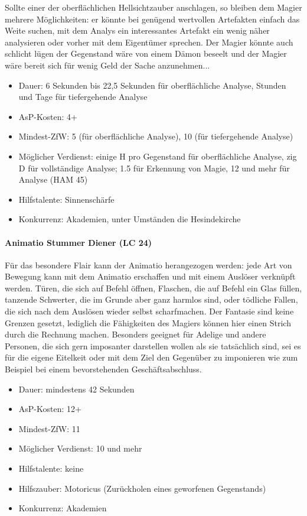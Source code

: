 Sollte einer der oberflächlichen Hellsichtzauber anschlagen, so bleiben dem Magier mehrere Möglichkeiten: er könnte bei genügend wertvollen Artefakten einfach das Weite suchen, mit dem Analys ein interessantes Artefakt ein wenig näher analysieren oder vorher mit dem Eigentümer sprechen. Der Magier könnte auch schlicht lügen der Gegenstand wäre von einem Dämon beseelt und der Magier wäre bereit sich für wenig Geld der Sache anzunehmen...
\begin{itemize}
	\item Dauer: 6 Sekunden bis 22,5 Sekunden für oberflächliche Analyse, Stunden und Tage für tiefergehende Analyse
	\item AsP-Kosten: 4+
	\item Mindest-ZfW: 5 (für oberflächliche Analyse), 10 (für tiefergehende Analyse)
	\item Möglicher Verdienst: einige H pro Gegenstand für oberflächliche Analyse, zig D für vollständige Analyse; \SI{1,5}{\D} für Erkennung von Magie, \SI{12}{\D} und mehr für Analyse (HAM 45)
	\item Hilfstalente: Sinnenschärfe
	\item Konkurrenz: Akademien, unter Umständen die Hesindekirche
\end{itemize}

\paragraph{Animatio Stummer Diener (LC 24)}
Für das besondere Flair kann der Animatio herangezogen werden: jede Art von Bewegung kann mit dem Animatio erschaffen und mit einem Auslöser verknüpft werden. Türen, die sich auf Befehl öffnen, Flaschen, die auf Befehl ein Glas füllen, tanzende Schwerter, die im Grunde aber ganz harmlos sind, oder tödliche Fallen, die sich nach dem Auslösen wieder selbst scharfmachen. Der Fantasie sind keine Grenzen gesetzt, lediglich die Fähigkeiten des Magiers können hier einen Strich durch die Rechnung machen. Besonders geeignet für Adelige und andere Personen, die sich gern imposanter darstellen wollen als sie tatsächlich sind, sei es für die eigene Eitelkeit oder mit dem Ziel den Gegenüber zu imponieren wie zum Beispiel bei einem bevorstehenden Geschäftsabschluss.
\begin{itemize}
	\item Dauer: mindestens 42 Sekunden
	\item AsP-Kosten: 12+
	\item Mindest-ZfW: 11
	\item Möglicher Verdienst: \SI{10}{\D} und mehr
	\item Hilfstalente: keine
	\item Hilfszauber: Motoricus (Zurückholen eines geworfenen Gegenstands)
	\item Konkurrenz: Akademien
\end{itemize}

